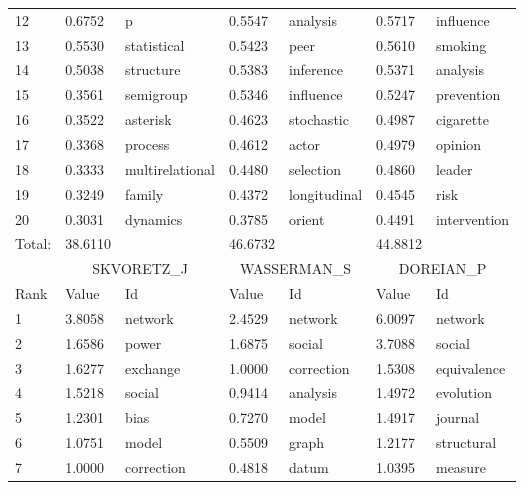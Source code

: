 \documentclass[11pt]{article} %
\begin{document}
\begin{center}
\begin{longtable}{p{0.7cm}|p{1.3cm}|p{2.6cm}||p{1.3cm}|p{2.6cm}||p{1.3cm}|p{2.6cm}}
          12   & 	0.6752  &  p		    &	0.5547  &	 analysis	    &	    0.5717  &	 influence	   \\
          13   & 	0.5530  &  statistical	    &	0.5423  &	 peer		    &	    0.5610  &	 smoking	   \\
          14   & 	0.5038  &  structure	    &	0.5383  &	 inference	    &	    0.5371  &	 analysis	   \\
          15   & 	0.3561  &  semigroup	    &	0.5346  &	 influence	    &	    0.5247  &	 prevention	   \\
          16   & 	0.3522  &  asterisk	    &	0.4623  &	 stochastic	    &	    0.4987  &	 cigarette	   \\
          17   & 	0.3368  &  process	    &	0.4612  &	 actor		    &	    0.4979  &	 opinion	   \\
          18   & 	0.3333  &  multirelational  &	0.4480  &	 selection	    &	    0.4860  &	 leader	   \\
          19   & 	0.3249  &  family	    &	0.4372  &	 longitudinal	    &	    0.4545  &	 risk	   \\
          20   & 	0.3031  &  dynamics	    &	0.3785  &	 orient		    &	    0.4491  &	 intervention  \\ \hline
       Total:    & 38.6110	& 		    &	46.6732 &	&       	    44.8812&	 	   \\ \hline
  & \multicolumn{2}{c}{SKVORETZ\_J} &  \multicolumn{2}{c}{WASSERMAN\_S}	  & 	 \multicolumn{2}{c}{DOREIAN\_P} \\ \hline\hline      
             Rank   &   Value   &  Id		 &      Value   &  Id		 & 	Value  &   Id \\ \hline
         1   &  3.8058   &  network	 &     2.4529   &  network		 &     6.0097  &   network \\
         2   &  1.6586   &  power		 &     1.6875   &  social		 &     3.7088  &   social \\
         3   &  1.6277   &  exchange	 &     1.0000   &  correction	 &     1.5308  &   equivalence \\
         4   &  1.5218   &  social		 &     0.9414   &  analysis	 &     1.4972  &   evolution \\
         5   &  1.2301   &  bias		 &     0.7270   &  model		 &     1.4917  &   journal \\
         6   &  1.0751   &  model		 &     0.5509   &  graph		 &     1.2177  &   structural \\
         7   &  1.0000   &  correction	 &     0.4818   &  datum		 &     1.0395  &   measure \\

\end{longtable}
\end{center}
\end{document}
